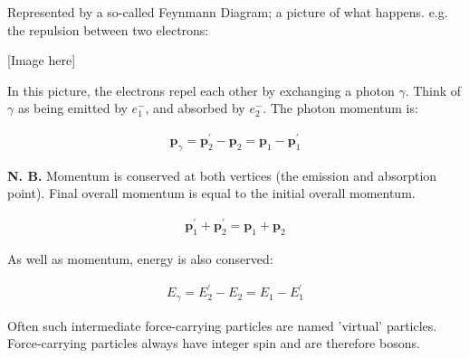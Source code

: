 \documentclass[10pt,a4paper]{article}
\begin{document}
Represented by a so-called Feynmann Diagram; a picture of what happens. e.g. the repulsion between two electrons:

[Image here]

In this picture, the electrons repel each other by exchanging a photon $\gamma$. Think of $\gamma$ as being emitted by $e_{1}^{-}$, and absorbed by $e_{2}^{-}$. The photon momentum is:

\begin{align*}
\textbf{p}_{\gamma} = \textbf{p}_{2}^{\prime} -  \textbf{p}_{2} =  \textbf{p}_{1} -  \textbf{p}_{1}^{\prime}
\end{align*}

\textbf{N. B.} Momentum is conserved at both vertices (the emission and absorption point). Final overall momentum is equal to the initial overall momentum.

\begin{align*}
\textbf{p}_{1}^{\prime} + \textbf{p}_{2}^{\prime} = \textbf{p}_{1} + \textbf{p}_{2}
\end{align*}

As well as momentum, energy is also conserved:

\begin{align*}
E_{\gamma} = E_{2}^{\prime} - E_{2} = E_{1} - E_{1}^{\prime}
\end{align*}

Often such intermediate force-carrying particles are named 'virtual' particles. Force-carrying particles always have integer spin and are therefore bosons.
\end{document}
